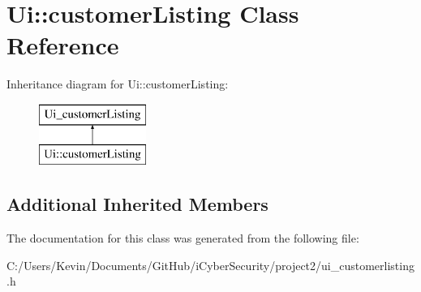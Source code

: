 \hypertarget{class_ui_1_1customer_listing}{}\section{Ui\+:\+:customer\+Listing Class Reference}
\label{class_ui_1_1customer_listing}
Inheritance diagram for Ui\+:\+:customer\+Listing\+:\begin{figure}[H]
\begin{center}
\leavevmode
\includegraphics[height=2.000000cm]{class_ui_1_1customer_listing}
\end{center}
\end{figure}
\subsection*{Additional Inherited Members}


The documentation for this class was generated from the following file\+:\begin{DoxyCompactItemize}
\item 
C\+:/\+Users/\+Kevin/\+Documents/\+Git\+Hub/i\+Cyber\+Security/project2/ui\+\_\+customerlisting.\+h\end{DoxyCompactItemize}
